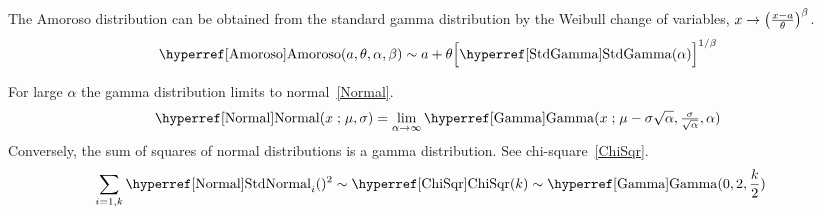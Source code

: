 The Amoroso distribution can be obtained from the standard gamma distribution by the Weibull change of variables, $x \to \Left(\tfrac{x-a}{\theta}\Right)^\beta$.
\[
\opr{Amoroso}(a ,\theta,\alpha,\beta) \sim
a+\theta \Big[{\opr{StdGamma}}(\alpha)\Big]^{1/\beta} 
\checked
\notag
\]


For large $\alpha$ the gamma distribution limits to normal~\eqref{Normal}.
\[
\opr{Normal}(x\given \mu,\sigma)   = 
\lim_{\alpha\rightarrow\infty} \opr{Gamma} (x\given  \mu- \sigma\sqrt{\alpha}, \tfrac{\sigma}{\sqrt{\alpha}}, \alpha)
\checked %
\notag
\]
Conversely, the sum of squares of normal distributions is a gamma distribution. See chi-square~\eqref{ChiSqr}.
\begin{align*}
\sum_{i=1,k}\oprr{StdNormal}{Normal}_i()^{2} & \sim \opr{ChiSqr}(k)  
 \sim \opr{Gamma}(0, 2,\frac{k}{2})  
 \checked
 \notag
\end{align*}



